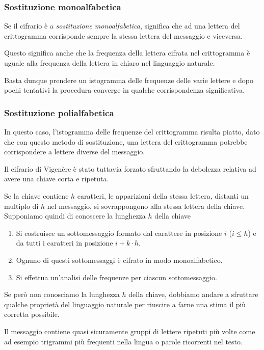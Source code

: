\subsubsection{Sostituzione monoalfabetica}
Se il cifrario \`e a \emph{sostituzione monoalfabetica}, significa che ad una lettera del crittogramma corrisponde
sempre la stessa lettera del messaggio e viceversa.

Questo significa anche che la frequenza della lettera cifrata nel crittogramma \`e uguale alla frequenza della lettera in
chiaro nel linguaggio naturale.

Basta dunque prendere un istogramma delle frequenze delle varie lettere e dopo pochi tentativi la procedura converge in
qualche corrispondenza significativa.

\subsubsection{Sostituzione polialfabetica}
In questo caso, l'istogramma delle frequenze del crittogramma risulta piatto, dato che con questo metodo di
sostituzione, una lettera del crittogramma potrebbe corrispondere a lettere diverse del messaggio.

Il cifrario di Vigen\`ere \`e stato tuttavia forzato sfruttando la debolezza relativa ad avere una chiave corta e
ripetuta.

Se la chiave contiene $h$ caratteri, le apparizioni della stessa lettera, distanti un multiplo di $h$ nel messaggio, si
sovrappongono alla stessa lettera della chiave. Supponiamo quindi di conoscere la lunghezza $h$ della chiave
\begin{enumerate}
	\item Si costruisce un sottomessaggio formato dal carattere in posizione $i$ ($i \leq h$) e da tutti i caratteri
	      in posizione $i + k \cdot h$.
	\item Ognuno di questi sottomessaggi \`e cifrato in modo monoalfabetico.
	\item Si effettua un'analisi delle frequenze per ciascun sottomessaggio.
\end{enumerate}
Se per\`o non conosciamo la lunghezza $h$ della chiave, dobbiamo andare a sfruttare qualche propriet\`a del linguaggio
naturale per riuscire a farne una stima il pi\`u corretta possibile.

Il messaggio contiene quasi sicuramente gruppi di lettere ripetuti pi\`u volte come ad esempio trigrammi pi\`u frequenti
nella lingua o parole ricorrenti nel testo.

